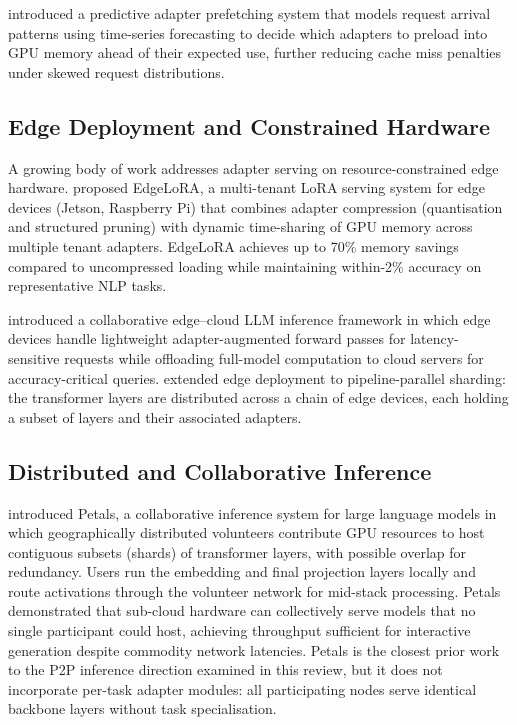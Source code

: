 \citet{NiPredictive2025} introduced a predictive adapter prefetching system that models
request arrival patterns using time-series forecasting to decide which adapters to
preload into GPU memory ahead of their expected use, further reducing cache miss
penalties under skewed request distributions.

\subsection{Edge Deployment and Constrained Hardware}
\label{sec:inference_systems:edge}

A growing body of work addresses adapter serving on resource-constrained edge hardware.
\citet{Shen2025EdgeLoRA} proposed EdgeLoRA, a multi-tenant LoRA serving system for edge
devices (Jetson, Raspberry Pi) that combines adapter compression (quantisation and
structured pruning) with dynamic time-sharing of GPU memory across multiple tenant
adapters. EdgeLoRA achieves up to 70\% memory savings compared to uncompressed loading
while maintaining within-2\% accuracy on representative NLP tasks.

\citet{CaiEdgeLLM2024} introduced a collaborative edge--cloud LLM inference framework
in which edge devices handle lightweight adapter-augmented forward passes for latency-
sensitive requests while offloading full-model computation to cloud servers for
accuracy-critical queries. \citet{ZhangEdgeShard2025} extended edge deployment to
pipeline-parallel sharding: the transformer layers are distributed across a chain of
edge devices, each holding a subset of layers and their associated adapters.

\subsection{Distributed and Collaborative Inference}
\label{sec:inference_systems:distributed}

\citet{Borzunov2023} introduced Petals, a collaborative inference system for large
language models in which geographically distributed volunteers contribute GPU
resources to host contiguous subsets (shards) of transformer layers, with possible overlap for redundancy. Users run the
embedding and final projection layers locally and route activations through the
volunteer network for mid-stack processing. Petals demonstrated that sub-cloud hardware
can collectively serve models that no single participant could host, achieving
throughput sufficient for interactive generation despite commodity network latencies.
Petals is the closest prior work to the P2P inference direction examined in this review,
but it does not incorporate per-task adapter modules: all participating nodes serve
identical backbone layers without task specialisation.

